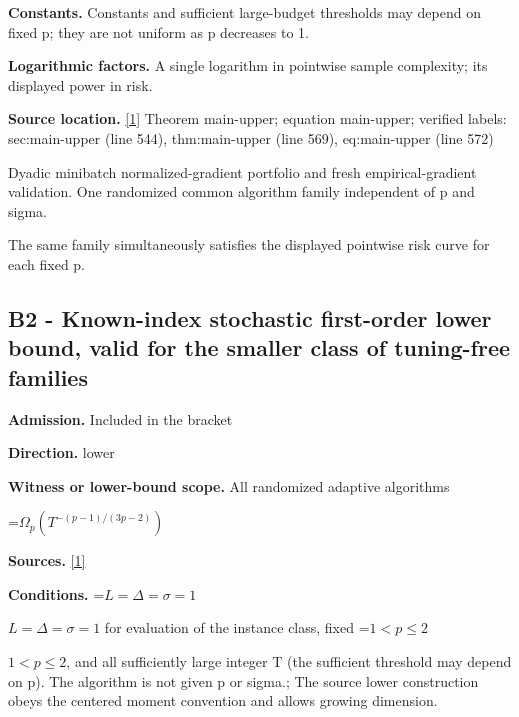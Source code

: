 \documentclass[10pt,a4paper]{article}
\newcommand{\AtlasMath}[1]{\par\begingroup\centering\setbox0=\hbox{$\displaystyle #1$}\ifdim\wd0>1.4\linewidth\typeout{ATLAS WIDE FORMULA: \the\wd0}\fi\ifdim\wd0>\linewidth\resizebox{\linewidth}{!}{\box0}\else\box0\fi\par\endgroup}
\newcommand{\AtlasInlineMath}[1]{\begingroup\setbox0=\hbox{$#1$}\ifdim\wd0>.4\linewidth\endgroup\AtlasMath{#1}\else\endgroup$#1$\fi}
\begin{document}
\textbf{Constants.} Constants and sufficient large-budget thresholds may depend on fixed p; they are not uniform as p decreases to 1.



\textbf{Logarithmic factors.} A single logarithm in pointwise sample complexity; its displayed power in risk.



\textbf{Source location.} \href{https://github.com/WU-Wendao/Colombo/blob/main/colombo_sensorium/Complexity_altas/data/sources/colombo/N05/manuscript.pdf}{[1]} Theorem main-upper; equation main-upper; verified labels: sec:main-upper (line 544), thm:main-upper (line 569), eq:main-upper (line 572)



Dyadic minibatch normalized-gradient portfolio and fresh empirical-gradient validation. One randomized common algorithm family independent of p and sigma.



The same family simultaneously satisfies the displayed pointwise risk curve for each fixed p.



\subsection{B2 - Known-index stochastic first-order lower bound, valid for the smaller class of tuning-free families}


\textbf{Admission.} Included in the bracket



\textbf{Direction.} lower



\textbf{Witness or lower-bound scope.} All randomized adaptive algorithms



\AtlasMath{\Omega_p\!\left(T^{-(p-1)/(3p-2)}\right)}


\textbf{Sources.} \href{https://github.com/WU-Wendao/Colombo/blob/main/colombo_sensorium/Complexity_altas/data/sources/colombo/N05/manuscript.pdf}{[1]}



\textbf{Conditions.} \AtlasInlineMath{L=\Delta=\sigma=1} for evaluation of the instance class, fixed \AtlasInlineMath{1<p\le2}, and all sufficiently large integer T (the sufficient threshold may depend on p). The algorithm is not given p or sigma.; The source lower construction obeys the centered moment convention and allows growing dimension.
\end{document}
